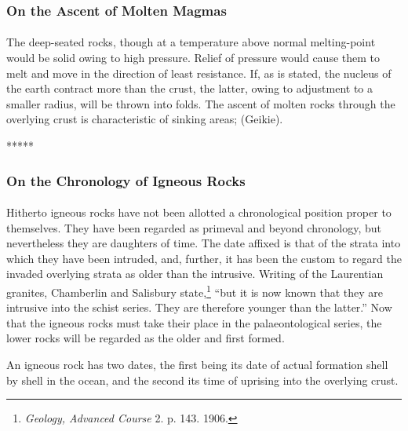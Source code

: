 \documentclass[a4paper, 12pt, oneside]{article}
\begin{document}
\subsubsection{On the Ascent of Molten Magmas}
\paragraph{}
The deep-seated rocks, though at a temperature above normal melting-point would be solid owing to high pressure. Relief of pressure would cause them to melt and move in the direction of least resistance. If, as is stated, the nucleus of the earth contract more than the crust, the latter, owing to adjustment to a smaller radius, will be thrown into folds. The ascent of molten rocks through the overlying crust is characteristic of sinking areas; (Geikie).

\centerline{*\hspace{15mm}*\hspace{15mm}*\hspace{15mm}*\hspace{15mm}*}
\bigskip

\subsubsection{On the Chronology of Igneous Rocks}
\paragraph{}
Hitherto igneous rocks have not been allotted a chronological position proper to themselves. They have been regarded as primeval and beyond chronology, but nevertheless they are daughters of time. The date affixed is that of the strata into which they have been intruded, and, further, it has been the custom to regard the invaded overlying strata as older than the intrusive. Writing of the Laurentian granites, Chamberlin and Salisbury state,\footnote{\emph{Geology, Advanced Course} 2. p. 143. 1906.} ``but it is now known that they are intrusive into the schist series. They are therefore younger than the latter.'' Now that the igneous rocks must take their place in the palaeontological series, the lower rocks will be regarded as the older and first formed.

An igneous rock has two dates, the first being its date of actual formation shell by shell in the ocean, and the second its time of uprising into the overlying crust.
\end{document}
